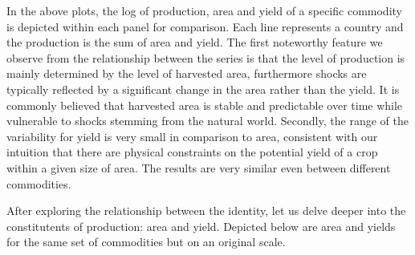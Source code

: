 \documentclass[nojss]{jss}\usepackage{graphicx, color}
\makeatletter
\newenvironment{kframe}{%
 \def\at@end@of@kframe{}%
 \ifinner\ifhmode%
  \def\at@end@of@kframe{\end{minipage}}%
  \begin{minipage}{\columnwidth}%
 \fi\fi%
 \def\FrameCommand##1{\hskip\@totalleftmargin \hskip-\fboxsep
 \colorbox{shadecolor}{##1}\hskip-\fboxsep
     \hskip-\linewidth \hskip-\@totalleftmargin \hskip\columnwidth}%
 \MakeFramed {\advance\hsize-\width
   \@totalleftmargin\z@ \linewidth\hsize
   \@setminipage}}%
 {\par\unskip\endMakeFramed%
 \at@end@of@kframe}
\newenvironment{knitrout}{}{} %
\makeatother
\begin{document}
\begin{knitrout}
\color{fgcolor}\begin{kframe}


{\ttfamily\noindent\bfseries\color{errorcolor}{\#\# Error: object 'plot.df' not found}}\end{kframe}
\end{knitrout}




\begin{knitrout}
\color{fgcolor}\begin{kframe}


{\ttfamily\noindent\bfseries\color{errorcolor}{\#\# Error: object 'plot.df' not found}}\end{kframe}
\end{knitrout}




\begin{knitrout}
\color{fgcolor}\begin{kframe}


{\ttfamily\noindent\bfseries\color{errorcolor}{\#\# Error: object 'dwheat' not found}}\end{kframe}
\end{knitrout}


In the above plots, the log of production, area and yield of a
specific commodity is depicted within each panel for comparison. Each
line represents a country and the production is the sum of area and
yield. The first noteworthy feature we observe from the relationship
between the series is that the level of production is mainly
determined by the level of harvested area, furthermore shocks are
typically reflected by a significant change in the area rather than
the yield. It is commonly believed that harvested area is stable and
predictable over time while vulnerable to shocks stemming from the
natural world.  Secondly, the range of the variability for yield is
very small in comparison to area, consistent with our intuition that
there are physical constraints on the potential yield of a crop within
a given size of area. The results are very similar even between
different commodities.

After exploring the relationship between the identity, let us delve
deeper into the constitutents of production: area and yield. Depicted
below are area and yields for the same set of commodities but on an
original scale.
\end{document}
